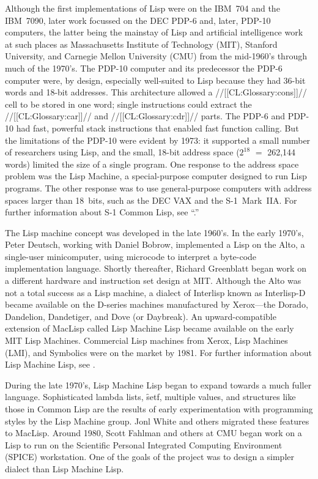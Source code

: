 Although the first implementations of Lisp were on the IBM~704 and the IBM~7090, later work focussed on the DEC PDP-6 and, later, PDP-10 computers, the latter being the mainstay of Lisp and artificial intelligence work at such places as  Massachusetts Institute of Technology (MIT), Stanford University, and  Carnegie Mellon University (CMU) from the mid-1960's through much of the 1970's. The PDP-10 computer and its predecessor the PDP-6 computer were, by design, especially well-suited to Lisp because they had 36-bit words and 18-bit addresses. This architecture allowed a //[[CL:Glossary:cons]]// cell to be stored in one word; single instructions could extract the  //[[CL:Glossary:car]]// and //[[CL:Glossary:cdr]]// parts.  The PDP-6 and PDP-10 had fast, powerful stack instructions that enabled fast function calling. But the limitations of the PDP-10 were evident by 1973: it supported a small number of researchers using Lisp, and the small, 18-bit address space ($2^{18}$ $=$ 262,144 words) limited the size of a single program. One response to the address space problem was the Lisp Machine, a special-purpose computer designed to run Lisp programs.  The other response was to use general-purpose computers with address spaces larger than 18~bits, such as the DEC VAX and the \hbox{S-1}~Mark~IIA. For further information about S-1 Common Lisp, see ``{\SOneCLPaper}.''
  
The Lisp machine concept was developed in the late 1960's.  In the early 1970's, Peter Deutsch, working with  Daniel Bobrow, implemented a Lisp on the Alto, a single-user minicomputer, using microcode to interpret a byte-code implementation language. Shortly thereafter, Richard Greenblatt began work on a different hardware and instruction set design at MIT. Although the Alto was not a total success as a Lisp machine, a dialect of Interlisp known as Interlisp-D became available on the D-series machines manufactured by Xerox---the Dorado, Dandelion, Dandetiger, and Dove (or Daybreak). An upward-compatible extension of MacLisp called Lisp Machine Lisp became available on the early MIT Lisp Machines. Commercial Lisp machines from Xerox, Lisp Machines (LMI), and Symbolics were on the market by 1981. For further information about Lisp Machine Lisp, see {\Chinual}.

During the late 1970's, Lisp Machine Lisp began to expand towards a much fuller language.  Sophisticated lambda lists,  \f{setf}, multiple values, and structures like those in Common Lisp are the results of early experimentation with programming styles by the Lisp Machine group. Jonl White and others migrated these features to MacLisp. Around 1980, Scott Fahlman and others at CMU began work on a Lisp to run on the Scientific Personal Integrated Computing Environment (SPICE) workstation.  One of the goals of the project was to design a simpler dialect than Lisp Machine Lisp.

